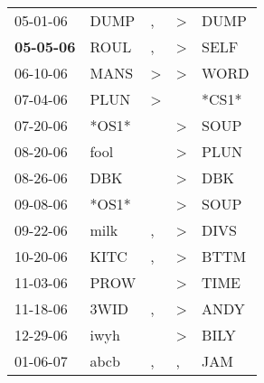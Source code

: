 \begin{supertabular}{p{0.07\textwidth}p{0.06\textwidth}p{0.02\textwidth}p{0.02\textwidth}p{0.06\textwidth}}
          05-01-06\textsuperscript{} &           DUMP\textsuperscript{} &                , &     \textgreater &           DUMP\textsuperscript{} \\
 \textbf{05-05-06\textsuperscript{}} &           ROUL\textsuperscript{} &                , &     \textgreater &           SELF\textsuperscript{} \\
          06-10-06\textsuperscript{} &           MANS\textsuperscript{} &     \textgreater &     \textgreater &           WORD\textsuperscript{} \\
          07-04-06\textsuperscript{} &           PLUN\textsuperscript{} &     \textgreater &                  &                            *CS1* \\
          07-20-06\textsuperscript{} &                            *OS1* &                  &     \textgreater &           SOUP\textsuperscript{} \\
          08-20-06\textsuperscript{} &           fool\textsuperscript{} &                  &     \textgreater &           PLUN\textsuperscript{} \\
          08-26-06\textsuperscript{} &            DBK\textsuperscript{} &                  &     \textgreater &            DBK\textsuperscript{} \\
          09-08-06\textsuperscript{} &                            *OS1* &                  &     \textgreater &           SOUP\textsuperscript{} \\
          09-22-06\textsuperscript{} &           milk\textsuperscript{} &                , &     \textgreater &           DIVS\textsuperscript{} \\
          10-20-06\textsuperscript{} &           KITC\textsuperscript{} &                , &     \textgreater &           BTTM\textsuperscript{} \\
          11-03-06\textsuperscript{} &           PROW\textsuperscript{} &                  &     \textgreater &           TIME\textsuperscript{} \\
          11-18-06\textsuperscript{} &           3WID\textsuperscript{} &                , &     \textgreater &           ANDY\textsuperscript{} \\
          12-29-06\textsuperscript{} &           iwyh\textsuperscript{} &                  &     \textgreater &           BILY\textsuperscript{} \\
          01-06-07\textsuperscript{} &           abcb\textsuperscript{} &                , &                , &            JAM\textsuperscript{} \\

\end{supertabular}
